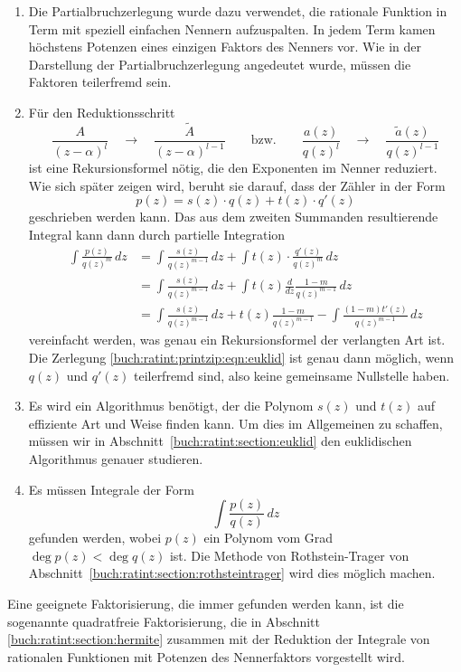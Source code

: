 \begin{enumerate}
\item
Die Partialbruchzerlegung wurde dazu verwendet, die 
rationale Funktion in Term mit speziell einfachen Nennern
aufzuspalten.
%
In jedem Term kamen höchstens Potenzen eines einzigen Faktors
des Nenners vor.
Wie in der Darstellung der Partialbruchzerlegung angedeutet
wurde, müssen die Faktoren teilerfremd sein.
\item
Für den Reduktionsschritt
\[
\frac{A}{(z-\alpha)^l}
\quad\to\quad
\frac{\tilde{A}}{(z-\alpha)^{l-1}}
\qquad\text{bzw.}\qquad
\frac{a(z)}{q(z)^l}
\quad\to\quad
\frac{\tilde{a}(z)}{q(z)^{l-1}}
\]
ist eine Rekursionsformel
nötig, die den Exponenten im Nenner reduziert.
%
Wie sich später zeigen wird, beruht sie darauf, dass der
Zähler in der Form
\begin{equation}
p(z) = s(z) \cdot q(z) + t(z)\cdot q'(z)
\label{buch:ratint:printzip:eqn:euklid}
\end{equation}
geschrieben werden kann.
Das aus dem zweiten Summanden resultierende Integral kann
dann durch partielle Integration
\begin{align*}
\int \frac{p(z)}{q(z)^m}\,dz
&=
\int \frac{s(z)}{q(z)^{m-1}}\,dz
+
\int t(z)\cdot \frac{q'(z)}{q(z)^m} \,dz
\\
&=
\int \frac{s(z)}{q(z)^{m-1}}\,dz
+
\int t(z) \frac{d}{dz} \frac{1-m}{q(z)^{m-1}}\,dz
\\
&=
\int \frac{s(z)}{q(z)^{m-1}}\,dz
+
t(z)\frac{1-m}{q(z)^{m-1}}
-
\int \frac{(1-m)t'(z)}{q(z)^{m-1}}\,dz
\end{align*}
vereinfacht werden, was genau ein Rekursionsformel der verlangten
Art ist.
Die Zerlegung \eqref{buch:ratint:printzip:eqn:euklid}
ist genau dann möglich, wenn $q(z)$ und $q'(z)$ teilerfremd
sind, also keine gemeinsame Nullstelle haben.
%
\item
Es wird ein Algorithmus benötigt, der die Polynom $s(z)$ und
$t(z)$ auf effiziente Art und Weise finden kann.
Um dies im Allgemeinen zu schaffen, müssen wir in
Abschnitt~\ref{buch:ratint:section:euklid} den euklidischen Algorithmus
genauer studieren.%
\item
Es müssen Integrale der Form 
\[
\int \frac{p(z)}{q(z)}\,dz
\]
gefunden werden, wobei $p(z)$ ein Polynom vom Grad $\deg p(z)<\deg q(z)$ ist.
Die Methode von Rothstein-Trager von
Abschnitt~\ref{buch:ratint:section:rothsteintrager}
wird dies möglich machen.
\end{enumerate}

Eine geeignete Faktorisierung, die immer gefunden werden kann,
ist die sogenannte quadratfreie Faktorisierung, die in Abschnitt 
\ref{buch:ratint:section:hermite}
zusammen mit der Reduktion der Integrale von rationalen
Funktionen mit Potenzen des Nennerfaktors vorgestellt wird.


